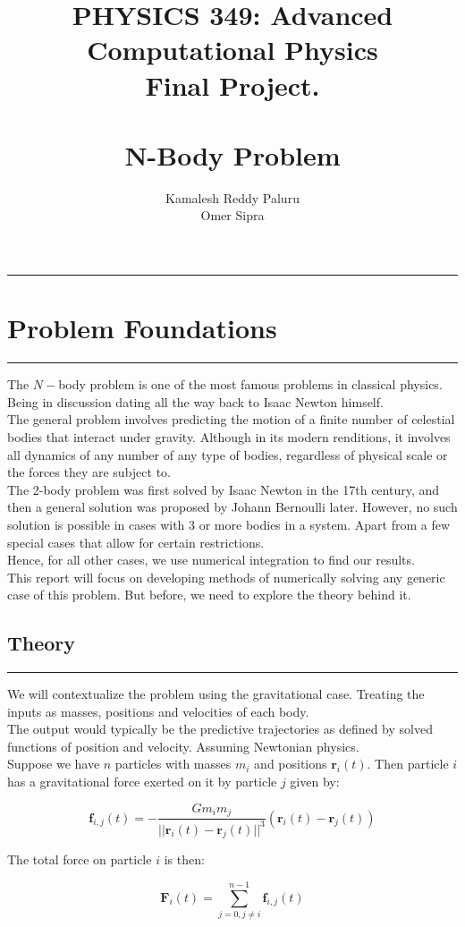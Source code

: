 \documentclass[hidelinks, 11pt, dvipsnames]{article}
\title{PHYSICS 349: Advanced Computational Physics\\
Final Project.\\
\textbf{  } \\
\textbf{N-Body Problem}}
\author{Kamalesh Reddy Paluru\\
Omer Sipra}
\newcommand{\psection}[1]{{
    \begin{center}
        \noindent \rule{17cm}{0.4pt}
            \section*{\LARGE #1}
        \noindent \rule{17cm}{0.4pt}
    \end{center}
}}
\newcommand{\psubsection}[1]{{
    \begin{center}
            \section*{\Large #1}
        \noindent \rule{17cm}{0.2pt}
    \end{center}
}}
\begin{document}
\maketitle

\psection{Problem Foundations}
The $N-$body problem is one of the most famous problems in classical physics. Being in discussion dating all the way back to Isaac Newton himself. \\

The general problem involves predicting the motion of a finite number of celestial bodies that interact under gravity. Although in its modern renditions, it involves all dynamics of any number of any type of bodies, regardless of physical scale or the forces they are subject to.\\

The 2-body problem was first solved by Isaac Newton in the 17th century, and then a general solution was proposed by Johann Bernoulli later. However, no such solution is possible in cases with 3 or more bodies in a system. Apart from a few special cases that allow for certain restrictions. \\

Hence, for all other cases, we use numerical integration to find our results.\\

This report will focus on developing methods of numerically solving any generic case of this problem. But before, we need to explore the theory behind it.

\newpage
\psubsection{Theory}
We will contextualize the problem using the gravitational case. Treating the inputs as masses, positions and velocities of each body. \\

The output would typically be the predictive trajectories as defined by solved functions of position and velocity. Assuming Newtonian physics. \\

Suppose we have $n$ particles with masses $m_i$ and positions $\mathbf{r}_i(t)$. Then particle $i$ has a gravitational force exerted on it by particle $j$ given by:

$$ \mathbf{f}_{i,j}(t) = -\frac{Gm_i m_j}{|| \mathbf{r}_i(t) - \mathbf{r}_j(t) ||^3}(\mathbf{r}_i(t) - \mathbf{r}_j(t)) $$

The total force on particle $i$ is then:

$$ \mathbf{F}_i(t) = \sum_{j=0, j\ne i}^{n-1} \mathbf{f}_{i,j}(t) $$
\end{document}
